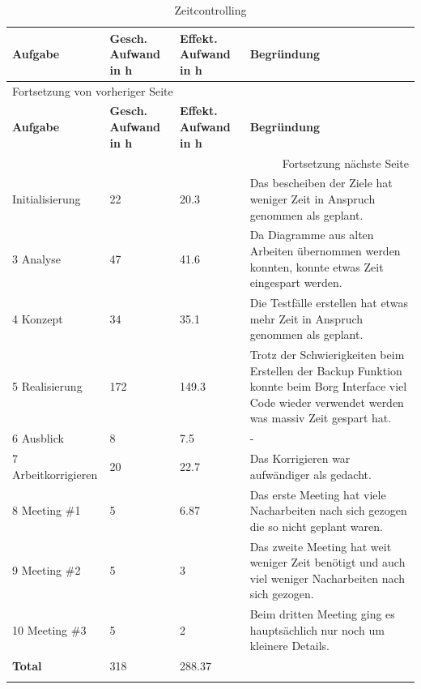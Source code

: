 \begin{longtable}{|p{}|p{2cm}|p{2cm}|p{6cm}|}
\hline
\textbf{Aufgabe}\cellcolor[HTML]{C0C0C0} & \textbf{Gesch. Aufwand in h}\cellcolor[HTML]{C0C0C0} & \textbf{Effekt. Aufwand in h}\cellcolor[HTML]{C0C0C0} & \textbf{Begründung}\cellcolor[HTML]{C0C0C0}\\
\hline
\endfirsthead
\multicolumn{4}{l}{Fortsetzung von vorheriger Seite} \\
\hline

\textbf{Aufgabe}\cellcolor[HTML]{C0C0C0} & \textbf{Gesch. Aufwand in h}\cellcolor[HTML]{C0C0C0} & \textbf{Effekt. Aufwand in h}\cellcolor[HTML]{C0C0C0} & \textbf{Begründung}\cellcolor[HTML]{C0C0C0} \\

\hline
\endhead
\hline\multicolumn{4}{r}{Fortsetzung nächste Seite} \\
\endfoot
\endlastfoot
\hline
2 Initialisierung & 22 & 20.3 & Das bescheiben der Ziele hat weniger Zeit in Anspruch genommen als geplant.\\
\hline
3 Analyse & 47 & 41.6 & Da Diagramme aus alten Arbeiten übernommen werden konnten, konnte etwas Zeit eingespart werden.\\
\hline
4 Konzept & 34 & 35.1 & Die Testfälle erstellen hat etwas mehr Zeit in Anspruch genommen als geplant.\\
\hline
5 Realisierung & 172 & 149.3 & Trotz der Schwierigkeiten beim Erstellen der Backup Funktion konnte beim Borg Interface viel Code wieder verwendet werden was massiv Zeit gespart hat.\\
\hline
6 Ausblick & 8 & 7.5 & -\\
\hline
7 Arbeit\newline korrigieren & 20 & 22.7 & Das Korrigieren war aufwändiger als gedacht.\\
\hline
8 Meeting \#1 & 5 & 6.87 & Das erste Meeting hat viele Nacharbeiten nach sich gezogen die so nicht geplant waren.\\
\hline
9 Meeting \#2 & 5 & 3 & Das zweite Meeting hat weit weniger Zeit benötigt und auch viel weniger Nacharbeiten nach sich gezogen.\\
\hline
10 Meeting \#3 & 5 & 2 & Beim dritten Meeting ging es hauptsächlich nur noch um kleinere Details.\\
\hline
\textbf{Total} & 318 & 288.37 & \\
\hline
\caption{\label{tab:orgdc653bf}
Zeitcontrolling}
\\
\end{longtable}

